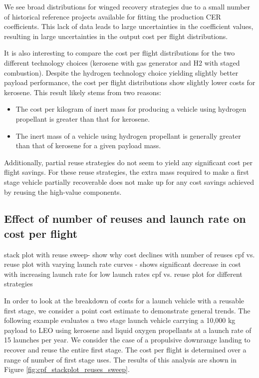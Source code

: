 \documentclass[conf]{new-aiaa}
\begin{document}
We see broad distributions for winged recovery strategies due to a small number of historical reference projects available for fitting the production CER coefficients. This lack of data leads to large uncertainties in the coefficient values, resulting in large uncertainties in the output cost per flight distributions. 

It is also interesting to compare the cost per flight distributions for the two different technology choices (kerosene with gas generator and H2 with staged combustion). Despite the hydrogen technology choice yielding slightly better payload performance, the cost per flight distributions show slightly lower costs for kerosene. This result likely stems from two reasons:

\begin{itemize}
  \item The cost per kilogram of inert mass for producing a vehicle using hydrogen propellant is greater than that for kerosene. 
  \item The inert mass of a vehicle using hydrogen propellant is generally greater than that of kerosene for a given payload mass.
\end{itemize}

Additionally, partial reuse strategies do not seem to yield any significant cost per flight savings. For these reuse strategies, the extra mass required to make a first stage vehicle partially recoverable does not make up for any cost savings achieved by reusing the high-value components. 


\subsection{Effect of number of reuses and launch rate on cost per flight}
stack plot with reuse sweep- show why cost declines with number of reuses
cpf vs. reuse plot with varying launch rate curves - shows significant decrease in cost with increasing launch rate for low launch rates
cpf vs. reuse plot for different strategies 

In order to look at the breakdown of costs for a launch vehicle with a reusable first stage, we consider a point cost estimate to demonstrate general trends. The following example evaluates a two stage launch vehicle carrying a 10,000 kg payload to LEO using kerosene and liquid oxygen propellants at a launch rate of 15 launches per year. We consider the case of a propulsive downrange landing to recover and reuse the entire first stage. The cost per flight is determined over a range of number of first stage uses. The results of this analysis are shown in Figure \ref{fig:cpf_stackplot_reuses_sweep}.
\end{document}
